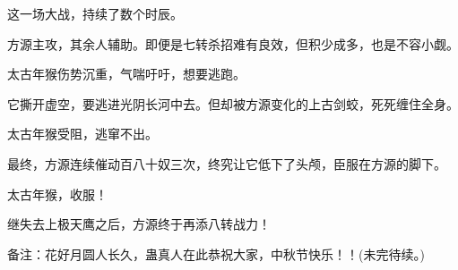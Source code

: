 \begin{this_body}
这一场大战，持续了数个时辰。

方源主攻，其余人辅助。即便是七转杀招难有良效，但积少成多，也是不容小觑。

太古年猴伤势沉重，气喘吁吁，想要逃跑。

它撕开虚空，要逃进光阴长河中去。但却被方源变化的上古剑蛟，死死缠住全身。

太古年猴受阻，逃窜不出。

最终，方源连续催动百八十奴三次，终究让它低下了头颅，臣服在方源的脚下。

太古年猴，收服！

继失去上极天鹰之后，方源终于再添八转战力！

备注：花好月圆人长久，蛊真人在此恭祝大家，中秋节快乐！！(未完待续。)

\end{this_body}

